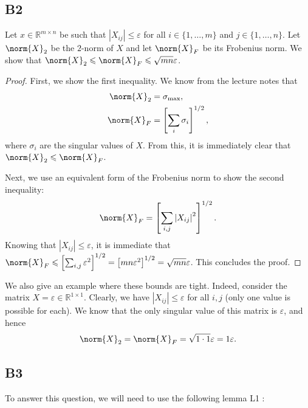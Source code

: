 \documentclass[11pt]{article}
\newcommand{\abs}[1]{\left\lvert#1\right\lvert}
\newcommand{\real}{\mathbb{R}} %
\newcommand{\snorm}[1]{\norm{#1}_2} %
\newcommand{\fnorm}[1]{\norm{#1}_F} %
\begin{document}
\subsection*{B2}
Let \(x \in \real^{m \times n}\) be such that \(\abs{X_{ij}} \leqslant \varepsilon\) for all \(i \in \{1, \dots, m\}\) and \(j \in \{1, \dots, n\}\).
Let \(\snorm{X}\) be the \(2\)-norm of \(X\) and let \(\fnorm{X}\) be its Frobenius norm.
We show that \(\snorm{X} \leqslant \fnorm{X} \leqslant \sqrt{mn} \varepsilon\).
\begin{proof}
	First, we show the first inequality.
	We know from the lecture notes that
	\begin{align*}
	\snorm{X} &= \sigma_{\textnormal{max}},\\
	\fnorm{X} &= \left[\sum_i \sigma_i\right]^{1/2},
	\end{align*}
	where \(\sigma_i\) are the singular values of \(X\).
	From this, it is immediately clear that \(\snorm{X} \leqslant \fnorm{X}\).
	
	Next, we use an equivalent form of the Frobenius norm to show the second inequality:
	\[
	\fnorm{X} = \left[\sum_{i, j} \abs{X_{ij}}^2 \right]^{1/2}.
	\]
	Knowing that \(\abs{X_{ij}} \leqslant \varepsilon\), it is immediate that \(\fnorm{X} \leqslant \left[\sum_{i, j} \varepsilon^2\right]^{1/2} = \left[mn \varepsilon^2\right]^{1/2} = \sqrt{mn} \varepsilon\).
	This concludes the proof.
\end{proof}

We also give an example where these bounds are tight.
Indeed, consider the matrix \(X = \varepsilon \in \real^{1 \times 1}\).
Clearly, we have \(\abs{X_{ij}} \leqslant \varepsilon \) for all \(i, j\) (only one value is possible for each).
We know that the only singular value of this matrix is \(\varepsilon\), and hence
\[
\snorm{X} = \fnorm{X} = \sqrt{1 \cdot 1} \varepsilon = 1 \varepsilon.
\]
\subsection*{B3}
To answer this question, we will need to use the following lemma L1 : 
\end{document}
